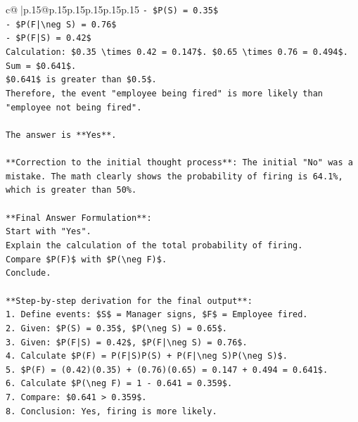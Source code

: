 \documentclass{article}
\begin{document}
{\begin{supertabular}{c@{$\;$}|p{.15\linewidth}@{}p{.15\linewidth}p{.15\linewidth}p{.15\linewidth}p{.15\linewidth}p{.15\linewidth}}
{{{\texttt{{-} \$P(S) = 0.35\$} \\
\texttt{{-} \$P(F|\textbackslash{}neg S) = 0.76\$} \\
\texttt{{-} \$P(F|S) = 0.42\$} \\
\texttt{Calculation: \$0.35 \textbackslash{}times 0.42 = 0.147\$. \$0.65 \textbackslash{}times 0.76 = 0.494\$. Sum = \$0.641\$.} \\
\texttt{\$0.641\$ is greater than \$0.5\$.} \\
\texttt{Therefore, the event "employee being fired" is more likely than "employee not being fired".} \\
\\ 
\texttt{The answer is **Yes**.} \\
\\ 
\texttt{**Correction to the initial thought process**: The initial "No" was a mistake. The math clearly shows the probability of firing is 64.1\%, which is greater than 50\%.} \\
\\ 
\texttt{**Final Answer Formulation**:} \\
\texttt{Start with "Yes".} \\
\texttt{Explain the calculation of the total probability of firing.} \\
\texttt{Compare \$P(F)\$ with \$P(\textbackslash{}neg F)\$.} \\
\texttt{Conclude.} \\
\\ 
\texttt{**Step{-}by{-}step derivation for the final output**:} \\
\texttt{1.  Define events: \$S\$ = Manager signs, \$F\$ = Employee fired.} \\
\texttt{2.  Given: \$P(S) = 0.35\$, \$P(\textbackslash{}neg S) = 0.65\$.} \\
\texttt{3.  Given: \$P(F|S) = 0.42\$, \$P(F|\textbackslash{}neg S) = 0.76\$.} \\
\texttt{4.  Calculate \$P(F) = P(F|S)P(S) + P(F|\textbackslash{}neg S)P(\textbackslash{}neg S)\$.} \\
\texttt{5.  \$P(F) = (0.42)(0.35) + (0.76)(0.65) = 0.147 + 0.494 = 0.641\$.} \\
\texttt{6.  Calculate \$P(\textbackslash{}neg F) = 1 {-} 0.641 = 0.359\$.} \\
\texttt{7.  Compare: \$0.641 > 0.359\$.} \\
\texttt{8.  Conclusion: Yes, firing is more likely.} \\
\\ 
}}}
\end{supertabular}}
\end{document}
